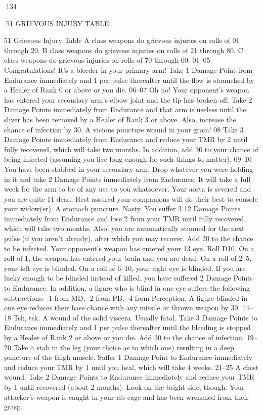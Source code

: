 \documentclass[a4paper]{article}
\begin{document}
\begin{multicols}{3}
134

51 GRIEVOUS INJURY TABLE

51 Grievous Injury Table
A class weapons do grievous injuries on rolls of 01
through 20.
B class weapons do grievous injuries on rolls of 21
through 80.
C class weapons do grievous injuries on rolls of 70
through 00.
01–05 Congratulations! It’s a bleeder in your
primary arm! Take 1 Damage Point from
Endurance immediately and 1 per pulse
thereafter until the flow is staunched by a
Healer of Rank 0 or above or you die.
06–07 Oh no! Your opponent’s weapon has
entered your secondary arm’s elbow joint
and the tip has broken off. Take 2 Damage Points immediately from Endurance
and that arm is useless until the sliver has
been removed by a Healer of Rank 3 or
above. Also, increase the chance of infection by 30.
A vicious puncture wound in your groin!
08
Take 3 Damage Points immediately from
Endurance and reduce your TMR by 2
until fully recovered, which will take two
months. In addition, add 30 to your
chance of being infected (assuming you
live long enough for such things to matter).
09–10 You have been stabbed in your secondary
arm. Drop whatever you were holding in
it and take 2 Damage Points immediately
from Endurance. It will take a full week
for the arm to be of any use to you whatsoever.
Your aorta is severed and you are quite
11
dead. Rest assured your companions will
do their best to console your widow(er).
A stomach puncture. Nasty. You suffer 3
12
Damage Points immediately from Endurance and lose 2 from your TMR until
fully recovered, which will take two
months. Also, you are automatically
stunned for the next pulse (if you aren’t
already), after which you may recover.
Add 20 to the chance to be infected.
Your opponent’s weapon has entered your
13
eye. Roll D10. On a roll of 1, the weapon
has entered your brain and you are dead.
On a roll of 2–5, your left eye is blinded.
On a roll of 6–10, your right eye is
blinded. If you are lucky enough to be
blinded instead of killed, you have suffered 2 Damage Points to Endurance. In
addition, a figure who is blind in one eye
suffers the following subtractions: -1 from
MD, -2 from PB, -4 from Perception. A
figure blinded in one eye reduces their
base chance with any missile or thrown
weapon by 30.
14–18 Tsk, tsk. A wound of the solid viscera.
Usually fatal. Take 3 Damage Points to
Endurance immediately and 1 per pulse
thereafter until the bleeding is stopped by
a Healer of Rank 2 or above or you die.
Add 30 to the chance of infection.
19–20 Take a stab in the leg (your choice as to
which one) resulting in a deep puncture of
the thigh muscle. Suffer 1 Damage Point
to Endurance immediately and reduce
your TMR by 1 until you heal, which will
take 4 weeks.
21–25 A chest wound. Take 2 Damage Points to
Endurance immediately and reduce your
TMR by 1 until recovered (about 2
months). Look on the bright side, though.
Your attacker’s weapon is caught in your
rib cage and has been wrenched from
their grasp.


\end{multicols}
\end{document}
